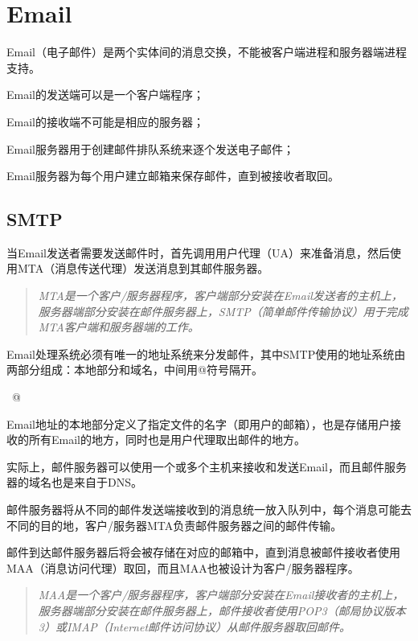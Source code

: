 \chapter{Email}



Email（电子邮件）是两个实体间的消息交换，不能被客户端进程和服务器端进程支持。

\begin{compactitem}
\item Email的发送端可以是一个客户端程序；
\item Email的接收端不可能是相应的服务器；
\item Email服务器用于创建邮件排队系统来逐个发送电子邮件；
\item Email服务器为每个用户建立邮箱来保存邮件，直到被接收者取回。
\end{compactitem}


\section{SMTP}

当Email发送者需要发送邮件时，首先调用用户代理（UA）来准备消息，然后使用MTA（消息传送代理）发送消息到其邮件服务器。

\begin{quote}
\textsl{MTA是一个客户/服务器程序，客户端部分安装在Email发送者的主机上，服务器端部分安装在邮件服务器上，SMTP（简单邮件传输协议）用于完成MTA客户端和服务器端的工作。}
\end{quote}




Email处理系统必须有唯一的地址系统来分发邮件，其中SMTP使用的地址系统由两部分组成：本地部分和域名，中间用@符号隔开。
\begin{center}
\mbox{~@~}
\end{center}


Email地址的本地部分定义了指定文件的名字（即用户的邮箱），也是存储用户接收的所有Email的地方，同时也是用户代理取出邮件的地方。

实际上，邮件服务器可以使用一个或多个主机来接收和发送Email，而且邮件服务器的域名也是来自于DNS。

邮件服务器将从不同的邮件发送端接收到的消息统一放入队列中，每个消息可能去不同的目的地，客户/服务器MTA负责邮件服务器之间的邮件传输。

邮件到达邮件服务器后将会被存储在对应的邮箱中，直到消息被邮件接收者使用MAA（消息访问代理）取回，而且MAA也被设计为客户/服务器程序。

\begin{quote}
\textsl{MAA是一个客户/服务器程序，客户端部分安装在Email接收者的主机上，服务器端部分安装在邮件服务器上，邮件接收者使用POP3（邮局协议版本3）或IMAP（Internet邮件访问协议）从邮件服务器取回邮件。}
\end{quote}

